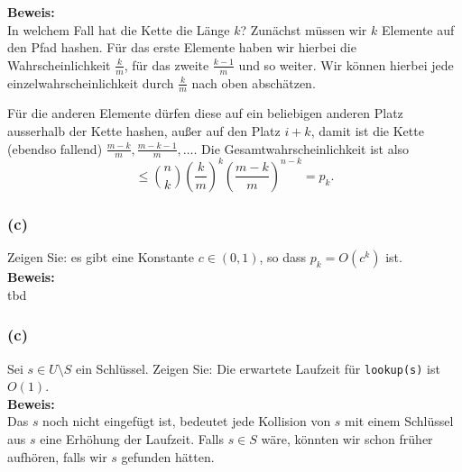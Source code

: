 \documentclass[11pt,a4paper,ngerman]{article}
\begin{document}
\noindent\textbf{Beweis:}\\
In welchem Fall hat die Kette die Länge $k$?
Zunächst müssen wir $k$ Elemente auf den Pfad hashen. Für das erste Elemente haben wir hierbei die Wahrscheinlichkeit $\frac{k}{m}$, für
das zweite $\frac{k-1}{m}$ und so weiter. Wir können hierbei jede einzelwahrscheinlichkeit durch $\frac{k}{m}$ nach oben abschätzen.

Für die anderen Elemente dürfen diese auf ein beliebigen anderen Platz ausserhalb der Kette hashen, außer auf den Platz $i+k$, damit ist die Kette (ebendso fallend) $\frac{m-k}{m}, \frac{m-k-1}{m}, \ldots$. Die Gesamtwahrscheinlichkeit ist also
$$
	\leq \binom{n}{k} \left(\frac{k}{m}\right)^k \left( \frac{m-k}{m} \right)^{n-k} = p_k.
$$

\subsubsection*{(c)}
Zeigen Sie: es gibt eine Konstante $c \in (0,1)$, so dass $p_k = O(c^k)$ ist.\\

\noindent\textbf{Beweis:}\\
tbd

\subsubsection*{(c)}
Sei $s \in U \setminus S$ ein Schlüssel. Zeigen Sie: Die erwartete Laufzeit für \lstinline|lookup(s)| ist $O(1)$.\\

\noindent\textbf{Beweis:}\\
Das $s$ noch nicht eingefügt ist, bedeutet jede Kollision von $s$ mit einem Schlüssel aus $s$ eine Erhöhung der Laufzeit. Falls $s \in S$ wäre,
könnten wir schon früher aufhören, falls wir $s$ gefunden hätten.\\
\end{document}
